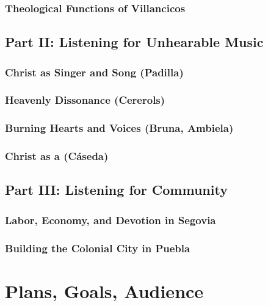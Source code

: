 \documentclass[tt]{vcbook-proposal}
\begin{document}
\subsubsection{Theological Functions of Villancicos}


\subsection{Part II: Listening for Unhearable Music}

\subsubsection{Christ as Singer and Song (Padilla)}

\subsubsection{Heavenly Dissonance (Cererols)}

\subsubsection{Burning Hearts and Voices (Bruna, Ambiela)}

\subsubsection{Christ as a  (Cáseda)}


\subsection{Part III: Listening for Community}

\subsubsection{Labor, Economy, and Devotion in Segovia}

\subsubsection{Building the Colonial City in Puebla}

\section{Plans, Goals, Audience}


\printbibliography
\end{document}
